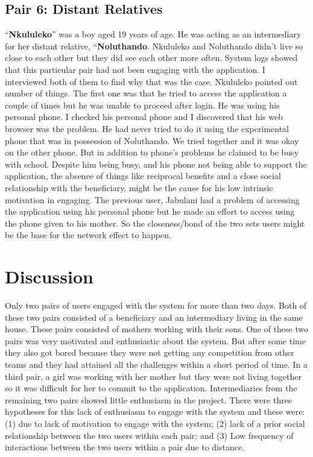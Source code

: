 \subsection*{\textbf{Pair 6: Distant Relatives}}
``\textbf{Nkululeko}'' was a boy aged 19 years of age. He was acting as an intermediary for her distant relative, ``\textbf{Noluthando}. Nkululeko and Noluthando didn't live so close to each other but they did see each other more often. System logs showed that this particular pair had not been engaging with the application. I interviewed both of them to find why that was the case. Nkululeko pointed out number of things. The first one was that he tried to access the application a couple of times but he was unable to proceed after login. He was using his personal phone. I checked his personal phone and I discovered that his web browser was the problem. He had never tried to do it using the experimental phone that was in possession of Noluthando. We tried together and it was okay on the other phone.  But in addition to phone's problems he claimed to be busy with school. Despite him being busy, and his phone not being able to support the application,  the absence of things like reciprocal benefits  and a close social relationship with the beneficiary, might be the cause for his low intrinsic motivation in engaging. The previous user, Jabulani had a problem of accessing the application using his personal phone but he made an effort to access using the phone  given to his mother. So the closeness/bond of the two sets users might be the base for the network effect to happen.
\section{Discussion}
Only two pairs of users engaged with the system for more than two days. Both of these two pairs consisted of a beneficiary and an  intermediary living in the same house. These pairs consisted of mothers working with their sons. One of these two pairs was very motivated and enthusiastic about the system. But after some time they also got bored because they were not getting any competition from other teams and they had attained all the challenges within a short period of time. In a third pair, a girl was working with her mother but they were not living together so it was difficult for her to commit to the application. Intermediaries from the remaining two pairs showed little enthusiasm in the project. There were three hypotheses for this lack of enthusiasm to engage with the system and these were: (1) due to lack of motivation to engage with the system; (2) lack of a prior social relationship between the two users within each pair; and (3) Low frequency of interactions between the two users within a pair due to distance.

